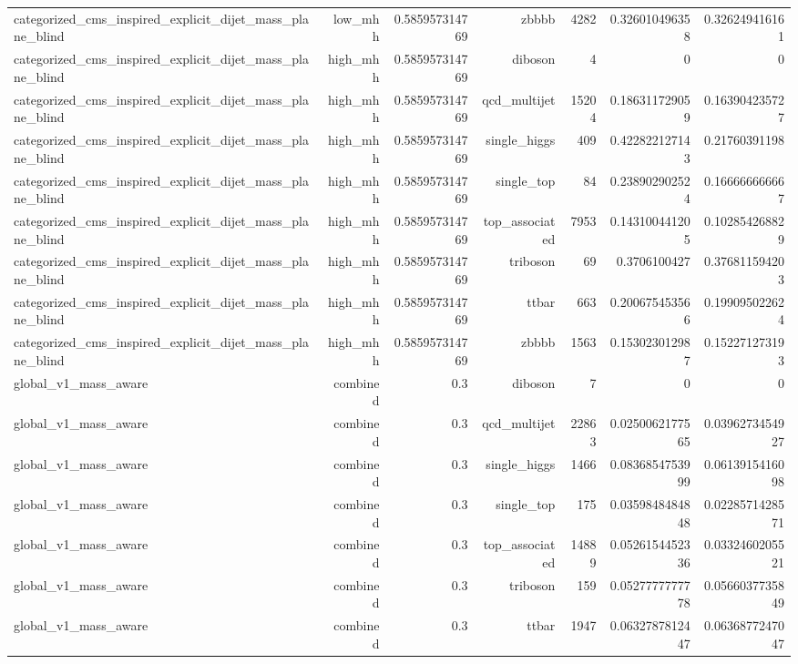 \begin{table}[htbp]
{\begin{tabular}{lrrrrrr}
categorized\_cms\_inspired\_explicit\_dijet\_mass\_plane\_blind & low\_mhh & 0.585957314769 & zbbbb & 4282 & 0.326010496358 & 0.326249416161 \\
categorized\_cms\_inspired\_explicit\_dijet\_mass\_plane\_blind & high\_mhh & 0.585957314769 & diboson & 4 & 0 & 0 \\
categorized\_cms\_inspired\_explicit\_dijet\_mass\_plane\_blind & high\_mhh & 0.585957314769 & qcd\_multijet & 15204 & 0.186311729059 & 0.163904235727 \\
categorized\_cms\_inspired\_explicit\_dijet\_mass\_plane\_blind & high\_mhh & 0.585957314769 & single\_higgs & 409 & 0.422822127143 & 0.21760391198 \\
categorized\_cms\_inspired\_explicit\_dijet\_mass\_plane\_blind & high\_mhh & 0.585957314769 & single\_top & 84 & 0.238902902524 & 0.166666666667 \\
categorized\_cms\_inspired\_explicit\_dijet\_mass\_plane\_blind & high\_mhh & 0.585957314769 & top\_associated & 7953 & 0.143100441205 & 0.102854268829 \\
categorized\_cms\_inspired\_explicit\_dijet\_mass\_plane\_blind & high\_mhh & 0.585957314769 & triboson & 69 & 0.3706100427 & 0.376811594203 \\
categorized\_cms\_inspired\_explicit\_dijet\_mass\_plane\_blind & high\_mhh & 0.585957314769 & ttbar & 663 & 0.200675453566 & 0.199095022624 \\
categorized\_cms\_inspired\_explicit\_dijet\_mass\_plane\_blind & high\_mhh & 0.585957314769 & zbbbb & 1563 & 0.153023012987 & 0.152271273193 \\
global\_v1\_mass\_aware & combined & 0.3 & diboson & 7 & 0 & 0 \\
global\_v1\_mass\_aware & combined & 0.3 & qcd\_multijet & 22863 & 0.0250062177565 & 0.0396273454927 \\
global\_v1\_mass\_aware & combined & 0.3 & single\_higgs & 1466 & 0.0836854753999 & 0.0613915416098 \\
global\_v1\_mass\_aware & combined & 0.3 & single\_top & 175 & 0.0359848484848 & 0.0228571428571 \\
global\_v1\_mass\_aware & combined & 0.3 & top\_associated & 14889 & 0.0526154452336 & 0.0332460205521 \\
global\_v1\_mass\_aware & combined & 0.3 & triboson & 159 & 0.0527777777778 & 0.0566037735849 \\
global\_v1\_mass\_aware & combined & 0.3 & ttbar & 1947 & 0.0632787812447 & 0.0636877247047 \\

\end{tabular}}
\end{table}
